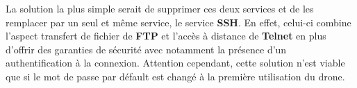 La solution la plus simple serait de supprimer ces deux services et de les remplacer par un seul et même service, le service \textbf{SSH}. En effet, celui-ci combine l'aspect transfert de fichier de \textbf{FTP} et l'accès à distance de \textbf{Telnet} en plus d'offrir des garanties de sécurité avec notamment la présence d'un authentification à la connexion. Attention cependant, cette solution n'est viable que si le mot de passe par défault est changé à la première utilisation du drone.
